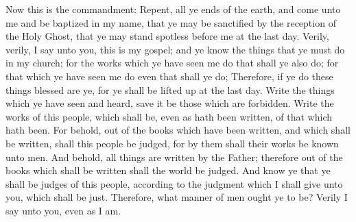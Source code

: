 Now this is the commandment: Repent, all ye ends of the earth, and come unto me and be baptized in my name, that ye may be sanctified by the reception of the Holy Ghost, that ye may stand spotless before me at the last day.
\bverse \iffalse Verily, verily, I say unto you, this is my gospel; and ye know the things that ye must do in my church; for the works which ye have seen me do that shall ye also do; for that which ye have seen me do even that shall ye do; \fi
Verily, verily, I say unto you, this is my gospel; and ye know the things that ye must do in my church; for the works which ye have seen me do that shall ye also do; for that which ye have seen me do even that shall ye do;
\bverse \iffalse Therefore, if ye do these things blessed are ye, for ye shall be lifted up at the last day. \fi
Therefore, if ye do these things blessed are ye, for ye shall be lifted up at the last day.
\bverse \iffalse Write the things which ye have seen and heard, save it be those which are forbidden. \fi
Write the things which ye have seen and heard, save it be those which are forbidden.
\bverse \iffalse Write the works of this people, which shall be, even as hath been written, of that which hath been. \fi
Write the works of this people, which shall be, even as hath been written, of that which hath been.
\bverse \iffalse For behold, out of the books which have been written, and which shall be written, shall this people be judged, for by them shall their works be known unto men. \fi
For behold, out of the books which have been written, and which shall be written, shall this people be judged, for by them shall their works be known unto men.
\bverse \iffalse And behold, all things are written by the Father; therefore out of the books which shall be written shall the world be judged. \fi
And behold, all things are written by the Father; therefore out of the books which shall be written shall the world be judged.
\bverse \iffalse And know ye that ye shall be judges of this people, according to the judgment which I shall give unto you, which shall be just. \fi
And know ye that ye shall be judges of this people, according to the judgment which I shall give unto you, which shall be just.
Therefore, what manner of men ought ye to be? Verily I say unto you, even as I am.

